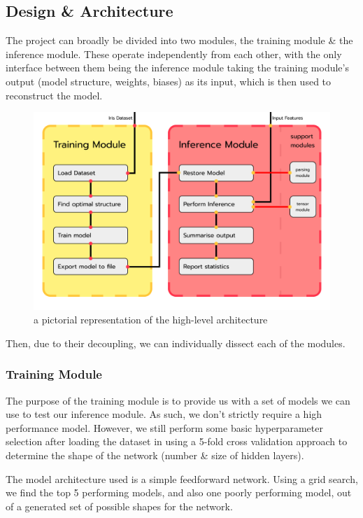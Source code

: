 \documentclass[12pt]{article}
\begin{document}
\subsection{Design \& Architecture}
The project can broadly be divided into two modules, the training module \& the inference module. These operate independently from each other, with the only interface between them being the inference module taking the training module's output (model structure, weights, biases) as its input, which is then used to reconstruct the model.

\newpage
\begin{figure}
	\includegraphics[width=0.85\pdfpagewidth]{../images/modules.png}
	\caption{a pictorial representation of the high-level architecture}
\end{figure}

Then, due to their decoupling, we can individually dissect each of the modules.

\subsubsection{Training Module}
The purpose of the training module is to provide us with a set of models we can use to test our inference module. As such, we don't strictly require a high performance model. However, we still perform some basic hyperparameter selection after loading the dataset in using a 5-fold cross validation approach to determine the shape of the network (number \& size of hidden layers).\bigskip

The model architecture used is a simple feedforward network. Using a grid search, we find the top 5 performing models, and also one poorly performing model, out of a generated set of possible shapes for the network.\bigskip
\end{document}
